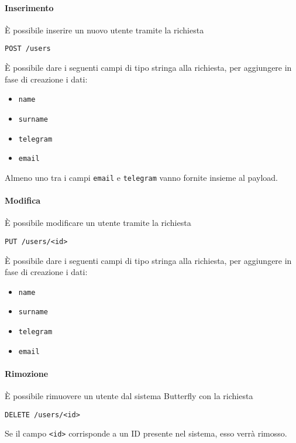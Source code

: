 \paragraph{Inserimento}
È possibile inserire un nuovo utente tramite la richiesta
    \begin{center}
        \texttt{POST /users}
    \end{center}

È possibile dare i seguenti campi di tipo stringa alla richiesta, per aggiungere in fase di creazione
i dati:
\begin{itemize}[noitemsep]
    \item \texttt{name}
    \item \texttt{surname}
    \item \texttt{telegram}
    \item \texttt{email}
\end{itemize}
Almeno uno tra i campi \texttt{email} e \texttt{telegram} vanno fornite insieme al payload.


\paragraph{Modifica}

È possibile modificare un utente tramite la richiesta
\begin{center}
    \texttt{PUT /users/<id>}
\end{center}
È possibile dare i seguenti campi di tipo stringa alla richiesta, per aggiungere in fase di creazione
i dati:
\begin{itemize}[noitemsep]
    \item \texttt{name}
    \item \texttt{surname}
    \item \texttt{telegram}
    \item \texttt{email}
\end{itemize}


\paragraph{Rimozione}

È possibile rimuovere un utente dal sistema Butterfly con la richiesta
\begin{center}
    \texttt{DELETE /users/<id>}
\end{center}

Se il campo \texttt{<id>} corrisponde a un ID presente nel sistema, esso verrà rimosso.


